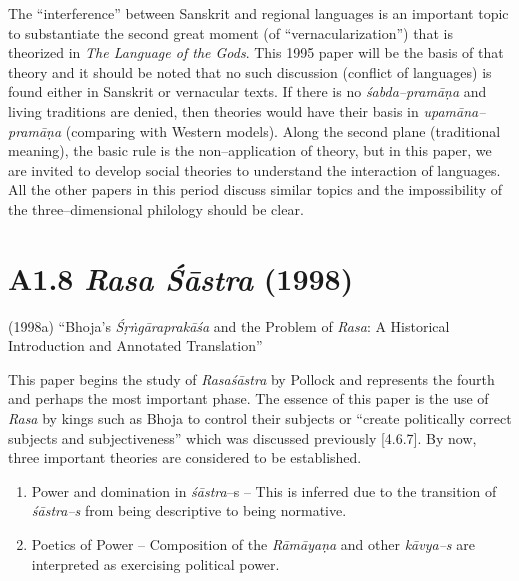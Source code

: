 {{The “interference” between Sanskrit and regional languages is an important topic to substantiate the second great moment (of “vernacularization”) that is theorized in \textit{The Language of the Gods}. This 1995 paper will be the basis of that theory and it should be noted that no such discussion (conflict of languages) is found either in Sanskrit or vernacular texts. If there is no \textit{śabda–pramāṇa} and living traditions are denied, then theories would have their basis in \textit{upamāna–pramāṇa} (comparing with Western models). Along the second plane (traditional meaning), the basic rule is the non–application of theory, but in this paper, we are invited to develop social theories to understand the interaction of languages. All the other papers in this period discuss similar topics and the impossibility of the three–dimensional philology should be clear.

\vspace{-.3cm}

\section*{A1.8 \textit{Rasa Śāstra} (1998)}

(1998a) “Bhoja's {\it Śṛṅgāraprakāśa} and the Problem of {\it Rasa}: A Historical Introduction and Annotated Translation”

This paper begins the study of \textit{Rasaśāstra} by Pollock and represents the fourth and perhaps the most important phase. The essence of this paper is the use of \textit{Rasa} by kings such as Bhoja to control their subjects or “create politically correct subjects and subjectiveness” which was discussed previously [4.6.7]. By now, three important theories are considered to be established.

\vspace{-.3cm}

\begin{enumerate}
\itemsep=0pt
\item Power and domination in \textit{śāstra}–s – This is inferred due to the transition of \textit{śāstra–s }from being descriptive to being normative.

 \item Poetics of Power – Composition of the \textit{Rāmāyaṇa} and other\textit{ kāvya–s }are interpreted as exercising political power.


\end{enumerate}}}
